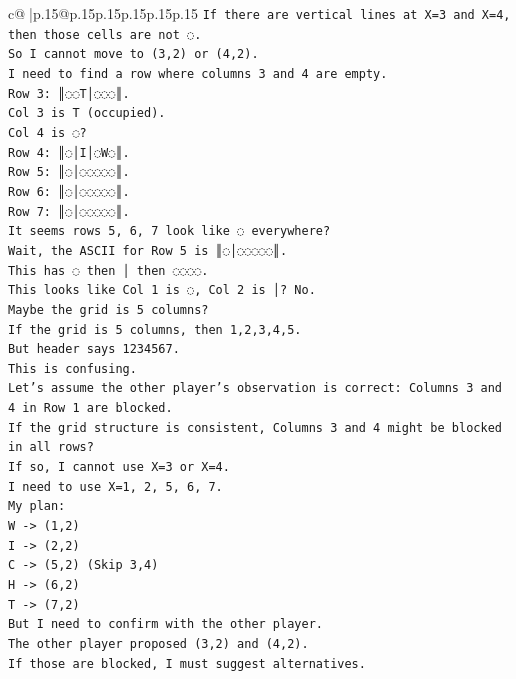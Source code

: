 \documentclass{article}
\begin{document}
{\begin{supertabular}{c@{$\;$}|p{.15\linewidth}@{}p{.15\linewidth}p{.15\linewidth}p{.15\linewidth}p{.15\linewidth}p{.15\linewidth}}
{{{\texttt{If there are vertical lines at X=3 and X=4, then those cells are not ◌.} \\
\texttt{So I cannot move to (3,2) or (4,2).} \\
\texttt{I need to find a row where columns 3 and 4 are empty.} \\
\texttt{Row 3: ║◌◌T│◌◌◌║.} \\
\texttt{Col 3 is T (occupied).} \\
\texttt{Col 4 is ◌?} \\
\texttt{Row 4: ║◌│I│◌W◌║.} \\
\texttt{Row 5: ║◌│◌◌◌◌◌║.} \\
\texttt{Row 6: ║◌│◌◌◌◌◌║.} \\
\texttt{Row 7: ║◌│◌◌◌◌◌║.} \\
\texttt{It seems rows 5, 6, 7 look like ◌ everywhere?} \\
\texttt{Wait, the ASCII for Row 5 is ║◌│◌◌◌◌◌║.} \\
\texttt{This has ◌ then │ then ◌◌◌◌.} \\
\texttt{This looks like Col 1 is ◌, Col 2 is │? No.} \\
\texttt{Maybe the grid is 5 columns?} \\
\texttt{If the grid is 5 columns, then 1,2,3,4,5.} \\
\texttt{But header says 1234567.} \\
\texttt{This is confusing.} \\
\texttt{Let's assume the other player's observation is correct: Columns 3 and 4 in Row 1 are blocked.} \\
\texttt{If the grid structure is consistent, Columns 3 and 4 might be blocked in all rows?} \\
\texttt{If so, I cannot use X=3 or X=4.} \\
\texttt{I need to use X=1, 2, 5, 6, 7.} \\
\texttt{My plan:} \\
\texttt{W {-}> (1,2)} \\
\texttt{I {-}> (2,2)} \\
\texttt{C {-}> (5,2) (Skip 3,4)} \\
\texttt{H {-}> (6,2)} \\
\texttt{T {-}> (7,2)} \\
\texttt{But I need to confirm with the other player.} \\
\texttt{The other player proposed (3,2) and (4,2).} \\
\texttt{If those are blocked, I must suggest alternatives.} \\
}}}
\end{supertabular}}
\end{document}
